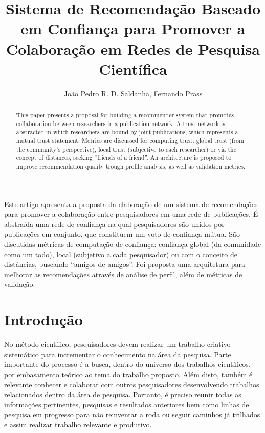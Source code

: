 \documentclass[12pt]{article}
\title{Sistema de Recomendação Baseado em Confiança para Promover a Colaboração em Redes de Pesquisa Científica}
\author{João Pedro R. D. Saldanha\inst{1}, Fernando Prass\inst{1}}
\begin{document}
 

\maketitle

\begin{abstract}
  This paper presents a proposal for building a recommender system that promotes collaboration between researchers in a 
  publication network. A trust network is abstracted in which researchers are bound by joint publications, which represents 
  a mutual trust statement. Metrics are discussed for  computing trust: global trust (from the community’s perspective), 
  local trust (subjective to each researcher) or via the concept of distances, seeking “friends of a friend”. An architecture 
  is proposed to improve recommendation quality trough profile analysis, as well as validation metrics.
\end{abstract}
     
\begin{resumo} 
  Este artigo apresenta a proposta da elaboração de um sistema de recomendações para promover a colaboração entre pesquisadores 
  em uma rede de publicações. É abstraída uma rede de confiança na qual pesquisadores são unidos por publicações em conjunto, 
  que constituem um voto de confiança mútua. São discutidas métricas de computação de confiança: confiança global (da 
  comunidade como um todo), local (subjetivo a cada pesquisador) ou com o conceito de distâncias, buscando “amigos de amigos”. 
  Foi proposta uma arquitetura para melhorar as recomendações através de análise  de perfil, além de métricas de validação.
\end{resumo}


\section{Introdução}

No método científico, pesquisadores devem realizar um trabalho criativo sistemático para incrementar 
o conhecimento na área da pesquisa. Parte importante do processo é a busca, dentro do universo dos 
trabalhos científicos, por embasamento teórico ao tema do trabalho proposto. Além disto, também é 
relevante conhecer e colaborar com outros pesquisadores desenvolvendo trabalhos relacionados dentro da 
área de pesquisa.  Portanto, é preciso reunir todas as informações pertinentes, pesquisas e resultados 
anteriores bem como linhas de pesquisa em progresso para não reinventar a roda ou seguir caminhos já 
trilhados e assim realizar trabalho relevante e produtivo.
\end{document}
